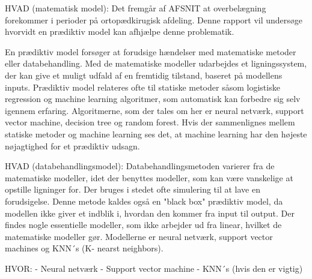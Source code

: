 %
HVAD (matematisk model):
Det fremgår af AFSNIT at overbelægning forekommer i perioder på ortopædkirugisk afdeling. Denne rapport vil undersøge hvorvidt en prædiktiv model kan afhjælpe denne problematik. 

En prædiktiv model forsøger at forudsige hændelser med matematiske metoder eller databehandling. Med de matematiske modeller udarbejdes et ligningssystem, der kan give et muligt udfald af en fremtidig tilstand, baseret på modellens inputs. Prædiktiv model relateres ofte til statiske metoder såsom logistiske regression og machine learning algoritmer, som automatisk kan forbedre sig selv igennem erfaring. Algoritmerne, som der tales om her er neural netværk, support vector machine, decision tree og random forest. Hvis der sammenlignes mellem statiske metoder og machine learning ses det, at machine learning har den højeste nøjagtighed for et prædiktiv udsagn. \cite{Luo2016} 





HVAD (databehandlingsmodel):
Databehandlingsmetoden varierer fra de matematiske modeller, idet der benyttes modeller, som kan være vanskelige at opstille ligninger for. Der bruges i stedet ofte simulering til at lave en forudsigelse. Denne metode kaldes også en "black box" prædiktiv model, da modellen ikke giver et indblik i, hvordan den kommer fra input til output. Der findes nogle essentielle modeller, som ikke arbejder ud fra linear, hvilket de matematiske modeller gør. Modellerne er neural netværk, support vector machines og KNN´s (K- nearst neighbors).

HVOR: 
- Neural netværk
- Support vector machine 
- KNN´s (hvis den er vigtig)


